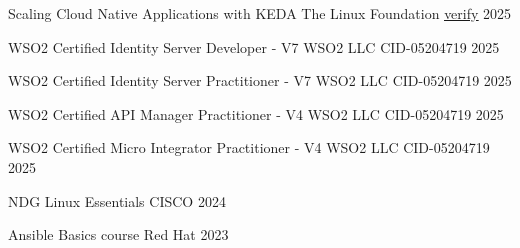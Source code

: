 

\begin{cvhonors}

  \cvhonor
    {Scaling Cloud Native Applications with KEDA} %
    {The Linux Foundation} %
    {\href{https://www.credly.com/badges/31d21f93-2972-4afa-a4c4-32ef947da77f/public_url}{\underline{{verify}}}} %
    {2025} %

  \cvhonor
    {WSO2 Certified Identity Server Developer - V7} %
    {WSO2 LLC} %
    {CID-05204719} %
    {2025} %

  \cvhonor
    {WSO2 Certified Identity Server Practitioner - V7} %
    {WSO2 LLC} %
    {CID-05204719} %
    {2025} %

  \cvhonor
    {WSO2 Certified API Manager Practitioner - V4} %
    {WSO2 LLC} %
    {CID-05204719} %
    {2025} %

 
  \cvhonor
    {WSO2 Certified Micro Integrator Practitioner - V4} %
    {WSO2 LLC} %
    {CID-05204719} %
    {2025} %

  \cvhonor
    {NDG Linux Essentials} %
    {CISCO} %
    {} %
    {2024} %

  \cvhonor
    {Ansible Basics course} %
    {Red Hat} %
    {} %
    {2023} %

\end{cvhonors}
